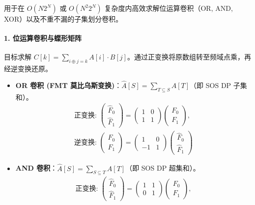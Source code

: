 \noindent
用于在 $O(N 2^N)$ 或 $O(N^2 2^N)$ 复杂度内高效求解位运算卷积（OR, AND, XOR）以及不重不漏的子集划分卷积。

\paragraph{1. 位运算卷积与蝶形矩阵}
目标求解 $C[k] = \sum_{i \oplus j = k} A[i] \cdot B[j]$。通过正变换将原数组转至频域点乘，再经逆变换还原。
\begin{itemize}
    \item \textbf{OR 卷积 (FMT 莫比乌斯变换)}：$\hat{A}[S] = \sum_{T \subseteq S} A[T]$（即 SOS DP 子集和）。
    \[ 
    \begin{gathered}
    \text{正变换: } \begin{pmatrix} \hat{F}_0 \\ \hat{F}_1 \end{pmatrix} = \begin{pmatrix} 1 & 0 \\ 1 & 1 \end{pmatrix} \begin{pmatrix} F_0 \\ F_1 \end{pmatrix}, \\
    \text{逆变换: } \begin{pmatrix} F_0 \\ F_1 \end{pmatrix} = \begin{pmatrix} 1 & 0 \\ -1 & 1 \end{pmatrix} \begin{pmatrix} \hat{F}_0 \\ \hat{F}_1 \end{pmatrix}
    \end{gathered}
    \]
    \item \textbf{AND 卷积}：$\hat{A}[S] = \sum_{S \subseteq T} A[T]$（即 SOS DP 超集和）。
    \[ 
    \begin{gathered}
    \text{正变换: } \begin{pmatrix} \hat{F}_0 \\ \hat{F}_1 \end{pmatrix} = \begin{pmatrix} 1 & 1 \\ 0 & 1 \end{pmatrix} \begin{pmatrix} F_0 \\ F_1 \end{pmatrix}, \\

\end{gathered}\]
\end{itemize}
